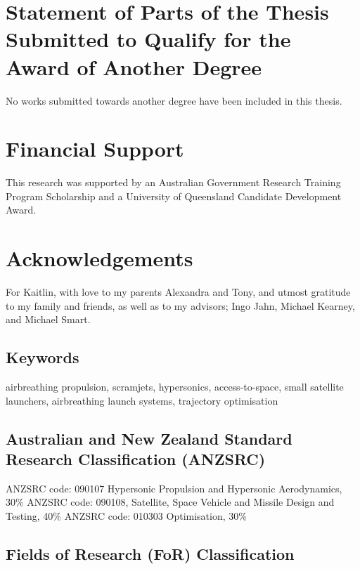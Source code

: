 \section*{Statement of Parts of the Thesis Submitted to Qualify for the Award of Another Degree}

No works submitted towards another degree have been included in this thesis.

\clearpage

\section*{Financial Support}
This research was supported by an Australian Government Research Training Program Scholarship and a University of Queensland Candidate Development Award.
\clearpage


\section*{Acknowledgements} 
  For Kaitlin, with love to my parents Alexandra and Tony, and utmost gratitude to my family and friends, as well as to my advisors; Ingo Jahn, Michael Kearney, and Michael Smart. 

      \vspace*{\fill}


\clearpage
\subsection*{Keywords}
  airbreathing propulsion, scramjets, hypersonics, access-to-space, small satellite launchers, airbreathing launch systems, trajectory optimisation

\subsection*{Australian and New Zealand Standard Research Classification (ANZSRC)}

ANZSRC code: 090107 Hypersonic Propulsion and Hypersonic Aerodynamics, 30\% \newline
ANZSRC code: 090108, Satellite, Space Vehicle and Missile Design and Testing, 40\% \newline
ANZSRC code: 010303 Optimisation, 30\% \newline

\subsection*{Fields of Research (FoR) Classification}

